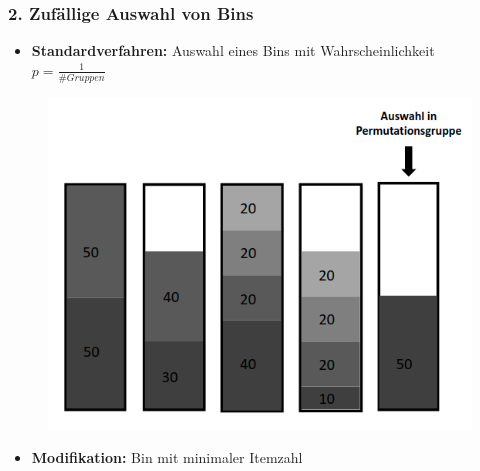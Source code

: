 \documentclass{beamer}
\begin{document}
\begin{frame}
\frametitle{2. Zufällige Auswahl von Bins}
\begin{footnotesize}
\begin{itemize}
\item \textbf{Standardverfahren:} Auswahl eines Bins mit Wahrscheinlichkeit $p=\frac{1}{\# Gruppen}$
\end{itemize}
\end{footnotesize}
\begin{figure}[!htbp]
\begin{center}
\includegraphics[scale=0.25]{img/HC_1.png}
\end{center}
\end{figure}
\begin{footnotesize}
\begin{itemize}
\item \textbf{Modifikation:} Bin mit minimaler Itemzahl
\end{itemize}
\end{footnotesize}

\end{frame}
\end{document}
